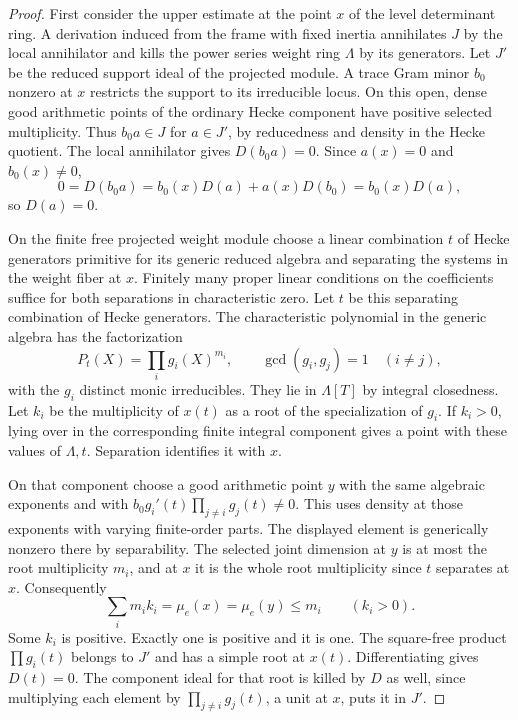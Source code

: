 \begin{proof}
First consider the upper estimate at the point \(x\) of the
level determinant ring. A derivation induced from the frame
with fixed inertia annihilates \(J\) by the local annihilator
and kills the power series weight ring \(\Lambda\) by its
generators. Let \(J'\) be the reduced support ideal of the
projected module. A trace Gram minor \(b_0\) nonzero at \(x\)
restricts the support to its irreducible locus. On this open,
dense good arithmetic points of the ordinary Hecke component
have positive selected multiplicity. Thus \(b_0a\in J\) for
\(a\in J'\), by reducedness and density in the Hecke quotient.
The local annihilator gives \(D(b_0a)=0\). Since \(a(x)=0\) and \(b_0(x)\ne0\), 
\[
 0=D(b_0a)=b_0(x)D(a)+a(x)D(b_0)=b_0(x)D(a),
\]
 so \(D(a)=0\).

On the finite free projected weight module choose a linear
combination \(t\) of Hecke generators primitive for its
generic reduced algebra and separating the systems in the
weight fiber at \(x\). Finitely many proper linear conditions
on the coefficients suffice for both separations in
characteristic zero. Let \(t\) be this separating combination of Hecke generators. The characteristic polynomial in the generic algebra has the factorization
\[
 P_t(X)=\prod_i g_i(X)^{m_i},\qquad \gcd(g_i,g_j)=1\quad(i\ne j),
\]
with the \(g_i\) distinct monic irreducibles. They lie in \(\Lambda[T]\) by integral closedness.
Let \(k_i\) be the multiplicity of \(x(t)\) as a root of
the specialization of \(g_i\). If \(k_i>0\), lying over in
the corresponding finite integral component gives a point
with these values of \(\Lambda,t\). Separation identifies it
with \(x\).

On that component choose a good arithmetic point
\(y\) with the same algebraic exponents and with
\(b_0g_i'(t)\prod_{j\ne i}g_j(t)\ne0\). This uses density
at those exponents with varying finite-order parts. The
displayed element is generically nonzero there by separability.
The selected joint dimension at \(y\) is at most the root
multiplicity \(m_i\), and at \(x\) it is the whole root
multiplicity since \(t\) separates at \(x\). Consequently
\[
       \sum_i m_i k_i=\mu_e(x)=\mu_e(y)\le m_i
                              \qquad(k_i>0).
\]
Some \(k_i\) is positive. Exactly one is positive and it is
one. The square-free product \(\prod g_i(t)\) belongs to \(J'\)
and has a simple root at \(x(t)\). Differentiating gives
\(D(t)=0\). The component ideal for that root is killed by
\(D\) as well, since multiplying each element by
\(\prod_{j\ne i}g_j(t)\), a unit at \(x\), puts it in \(J'\).


\end{proof}
